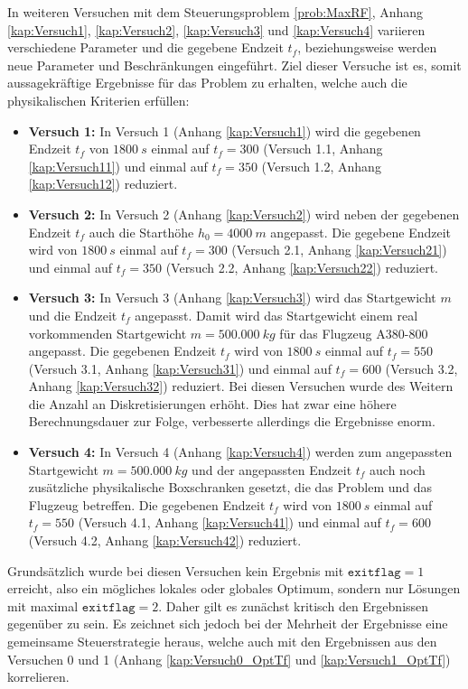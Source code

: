 In weiteren Versuchen mit dem Steuerungsproblem \ref{prob:MaxRF}, Anhang \ref{kap:Versuch1}, \ref{kap:Versuch2}, \ref{kap:Versuch3} und \ref{kap:Versuch4} variieren verschiedene Parameter und die gegebene Endzeit $t_f$, beziehungsweise werden neue Parameter und Beschränkungen eingeführt. Ziel dieser Versuche ist es, somit aussagekräftige Ergebnisse für das Problem zu erhalten, welche auch die physikalischen Kriterien erfüllen:
\begin{itemize}
\item \textbf{Versuch 1:} In Versuch 1 (Anhang \ref{kap:Versuch1}) wird die gegebenen Endzeit $t_f$ von $1800 \ s$ einmal auf $t_f = 300$ (Versuch 1.1, Anhang \ref{kap:Versuch11}) und einmal auf $t_f = 350$ (Versuch 1.2, Anhang \ref{kap:Versuch12}) reduziert. 
%
\item \textbf{Versuch 2:} In Versuch 2 (Anhang \ref{kap:Versuch2}) wird neben der gegebenen Endzeit $t_f$ auch die Starthöhe $h_0 = 4000 \ m$ angepasst. Die gegebene Endzeit wird von $1800 \ s$ einmal auf $t_f = 300$ (Versuch 2.1, Anhang \ref{kap:Versuch21}) und einmal auf $t_f = 350$ (Versuch 2.2, Anhang \ref{kap:Versuch22}) reduziert.
%
\item \textbf{Versuch 3:} In Versuch 3 (Anhang \ref{kap:Versuch3}) wird das Startgewicht $m$ und die Endzeit $t_f$ angepasst. Damit wird das Startgewicht einem real vorkommenden Startgewicht $m = 500.000 \ kg$ für das Flugzeug A380-800 angepasst. Die gegebenen Endzeit $t_f$ wird von $1800 \ s$ einmal auf $t_f = 550$ (Versuch 3.1, Anhang \ref{kap:Versuch31}) und einmal auf $t_f = 600$ (Versuch 3.2, Anhang \ref{kap:Versuch32}) reduziert. Bei diesen Versuchen wurde des Weitern die Anzahl an Diskretisierungen erhöht. Dies hat zwar eine höhere Berechnungsdauer zur Folge, verbesserte allerdings die Ergebnisse enorm.
%
\item \textbf{Versuch 4:} In Versuch 4 (Anhang \ref{kap:Versuch4}) werden zum angepassten Startgewicht $m = 500.000 \ kg$ und der angepassten Endzeit $t_f$ auch noch zusätzliche physikalische Boxschranken gesetzt, die das Problem und das Flugzeug betreffen. Die gegebenen Endzeit $t_f$ wird von $1800 \ s$ einmal auf $t_f = 550$ (Versuch 4.1, Anhang \ref{kap:Versuch41}) und einmal auf $t_f = 600$ (Versuch 4.2, Anhang \ref{kap:Versuch42}) reduziert.
\end{itemize}
Grundsätzlich wurde bei diesen Versuchen kein Ergebnis mit $\texttt{exitflag} = 1$ erreicht, also ein mögliches lokales oder globales Optimum, sondern nur Lösungen mit maximal $\texttt{exitflag} = 2$. Daher gilt es zunächst kritisch den Ergebnissen gegenüber zu sein. Es zeichnet sich jedoch bei der Mehrheit der Ergebnisse eine gemeinsame Steuerstrategie heraus, welche auch mit den Ergebnissen aus den Versuchen 0 und 1 (Anhang \ref{kap:Versuch0_OptTf} und \ref{kap:Versuch1_OptTf}) korrelieren.

